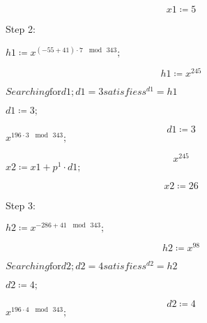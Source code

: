\documentclass[11pt,a4paper,fleqn]{article}
\begin{document}
\begin{enumerate}[1.]
\begin{flushleft}
\begin{mdframed}
			\begin{dmath}\label{(6)}
				\mathit{x1} \coloneqq 5
			\end{dmath}
			\begin{Maple Normal}
				Step 2:
			\end{Maple Normal}
			\mapleinput
			{$ \displaystyle \mathit{h1} \coloneqq x^{\mathit{(-55+41)}\cdot 7\,\mod \,343}; $}
			
			\begin{dmath}\label{(7)}
				\mathit{h1} \coloneqq x^{245}
			\end{dmath}
			\begin{Maple Normal}
				{$ \displaystyle \mathit{Searching} \boldsymbol{\mathrm{for}}\mathit{d1} ;\mathit{d1} =3\mathit{satisfies} s^{\mathit{d1}}=\mathit{h1}  $}
			\end{Maple Normal}
			\mapleinput
			{$ \displaystyle \mathit{d1} \coloneqq 3; $}
			
			\begin{dmath}\label{(8)}
				\mathit{d1} \coloneqq 3
			\end{dmath}
			\mapleinput
			{$ \displaystyle x^{196\cdot 3\,\mod \,343}; $}
			
			\begin{dmath}\label{(9)}
				x^{245}
			\end{dmath}
			\mapleinput
			{$ \displaystyle \mathit{x2} \coloneqq \mathit{x1} +p^{1}\cdot \mathit{d1} ; $}
			
			\begin{dmath}\label{(10)}
				\mathit{x2} \coloneqq 26
			\end{dmath}
			\begin{Maple Normal}
				Step 3:
			\end{Maple Normal}
			\mapleinput
			{$ \displaystyle \mathit{h2} \coloneqq x^{-286+41\,\mod \,343}; $}
			
			\begin{dmath}\label{(11)}
				\mathit{h2} \coloneqq x^{98}
			\end{dmath}
			\begin{Maple Normal}
				{$ \displaystyle \mathit{Searching} \boldsymbol{\mathrm{for}}\mathit{d2} ;\mathit{d2} =4\mathit{satisfies} s^{\mathit{d2}}=\mathit{h2}  $}
			\end{Maple Normal}
			\mapleinput
			{$ \displaystyle \mathit{d2} \coloneqq 4; $}
			
			\begin{dmath}\label{(12)}
				\mathit{d2} \coloneqq 4
			\end{dmath}
			\mapleinput
			{$ \displaystyle x^{196\cdot 4\,\mod \,343}; $}
			

\end{mdframed}
\end{flushleft}
\end{enumerate}
\end{document}
